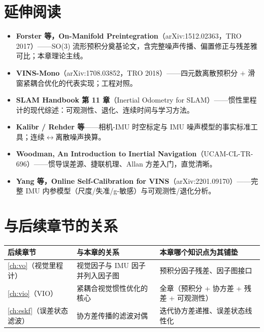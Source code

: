 \section*{延伸阅读}
\begin{itemize}
  \item \textbf{Forster 等，On-Manifold Preintegration}（arXiv:1512.02363，TRO 2017）\cite{forster2017preintegration}——SO(3) 流形预积分奠基论文，含完整噪声传播、偏置修正与残差雅可比；本章理论主线。
  \item \textbf{VINS-Mono}（arXiv:1708.03852，TRO 2018）\cite{qin2018vins}——四元数离散预积分 $+$ 滑窗紧耦合优化的代表实现；工程对照。
  \item \textbf{SLAM Handbook 第 11 章}（Inertial Odometry for SLAM）\cite{carlone2026handbook}——惯性里程计的现代综述：可观测性、退化、连续时间与学习方法。
  \item \textbf{Kalibr / Rehder 等}\cite{rehder2016kalibr}——相机-IMU 时空标定与 IMU 噪声模型的事实标准工具；连续$\leftrightarrow$离散噪声换算。
  \item \textbf{Woodman, An Introduction to Inertial Navigation}（UCAM-CL-TR-696）\cite{woodman2007inertial}——惯导误差源、捷联机理、Allan 方差入门，直觉清晰。
  \item \textbf{Yang 等，Online Self-Calibration for VINS}（arXiv:2201.09170）\cite{yang2022online}——完整 IMU 内参模型（尺度/失准/g-敏感）与可观测性/退化分析。
\end{itemize}

\section*{与后续章节的关系}
\begin{table}[H]\centering\small
\begin{tabular}{lll}
\toprule
后续章节 & 与本章的关系 & 本章哪个知识点为其铺垫 \\
\midrule
\cref{ch:vo}（视觉里程计）& 视觉因子与 IMU 因子并列入因子图 & 预积分因子残差、因子图接口 \\
\cref{ch:vio}（VIO）& 紧耦合视觉惯性优化的核心 & 全章（预积分 + 协方差 + 残差 + 可观测性） \\
\cref{ch:eskf}（误差状态滤波）& 协方差传播的滤波对偶 & 迭代协方差递推、误差状态线性化 \\
\bottomrule
\end{tabular}
\end{table}

